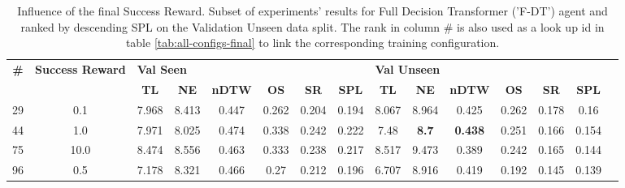 \begin{table}
\centering
\caption{\label{tab:f_dt_reward_scale}Influence of the final Success Reward. Subset of experiments' results for Full Decision Transformer ('F-DT') agent and ranked by descending SPL on the Validation Unseen data split. The rank in column \# is also used as a look up id in table \ref{tab:all-configs-final} to link the corresponding training configuration.}
\begin{tabular}{@{\hskip3pt}c@{\hskip3pt}c@{\hskip3pt}c@{\hskip3pt}c@{\hskip3pt}c@{\hskip3pt}c@{\hskip3pt}c@{\hskip3pt}c@{\hskip3pt}c@{\hskip3pt}c@{\hskip3pt}c@{\hskip3pt}c@{\hskip3pt}c@{\hskip3pt}c@{\hskip3pt}c}
\toprule
\textbf{\#} & \textbf{Success Reward } & \multicolumn{6}{l}{\textbf{Val Seen}} & \multicolumn{6}{l}{\textbf{Val Unseen}} \\
 \textbf{~} &               \textbf{~} &       \textbf{TL} & \textbf{NE} & \textbf{nDTW} & \textbf{OS} & \textbf{SR} & \textbf{SPL} &         \textbf{TL} &   \textbf{NE} &   \textbf{nDTW} & \textbf{OS} & \textbf{SR} & \textbf{SPL} \\
\midrule
         29 &                      0.1 &             7.968 &       8.413 &         0.447 &       0.262 &       0.204 &        0.194 &               8.067 &         8.964 &           0.425 &       0.262 &       0.178 &         0.16 \\
         44 &                      1.0 &             7.971 &       8.025 &         0.474 &       0.338 &       0.242 &        0.222 &                7.48 &  \textbf{8.7} &  \textbf{0.438} &       0.251 &       0.166 &        0.154 \\
         75 &                     10.0 &             8.474 &       8.556 &         0.463 &       0.333 &       0.238 &        0.217 &               8.517 &         9.473 &           0.389 &       0.242 &       0.165 &        0.144 \\
         96 &                      0.5 &             7.178 &       8.321 &         0.466 &        0.27 &       0.212 &        0.196 &               6.707 &         8.916 &           0.419 &       0.192 &       0.145 &        0.139 \\
\bottomrule
\end{tabular}
\end{table}

